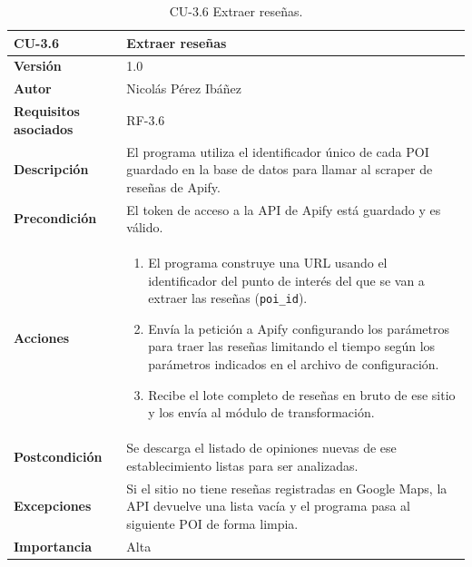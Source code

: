 \begin{table}[p]
	\centering
	\begin{tabularx}{\linewidth}{ p{} p{} }
		\toprule
		\textbf{CU-3.6}  & \textbf{Extraer reseñas}\\
		\toprule
		\textbf{Versión}              & 1.0    \\
		\textbf{Autor}                & Nicolás Pérez Ibáñez \\
		\textbf{Requisitos asociados} & RF-3.6 \\
		\textbf{Descripción}          & El programa utiliza el identificador único de cada POI guardado en la base de datos para llamar al scraper de reseñas de Apify. \\
		\textbf{Precondición}         & El token de acceso a la API de Apify está guardado y es válido. \\
		\textbf{Acciones}             &
		\begin{enumerate}
			\def\labelenumi{\arabic{enumi}.}
			\tightlist
			\item El programa construye una URL usando el identificador del punto de interés del que se van a extraer las reseñas (\texttt{poi\_id}).
			\item Envía la petición a Apify configurando los parámetros para traer las reseñas limitando el tiempo según los parámetros indicados en el archivo de configuración.
			\item Recibe el lote completo de reseñas en bruto de ese sitio y los envía al módulo de transformación.
		\end{enumerate}\\
		\textbf{Postcondición}        & Se descarga el listado de opiniones nuevas de ese establecimiento listas para ser analizadas. \\
		\textbf{Excepciones}          & Si el sitio no tiene reseñas registradas en Google Maps, la API devuelve una lista vacía y el programa pasa al siguiente POI de forma limpia. \\
		\textbf{Importancia}          & Alta \\
		\bottomrule
	\end{tabularx}
	\caption{CU-3.6 Extraer reseñas.}
\end{table}


